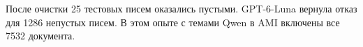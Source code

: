 После очистки 25 тестовых писем оказались пустыми. GPT-6-Luna вернула отказ для 1286 непустых писем. В этом опыте с темами Qwen в AMI включены все 7532 документа.
